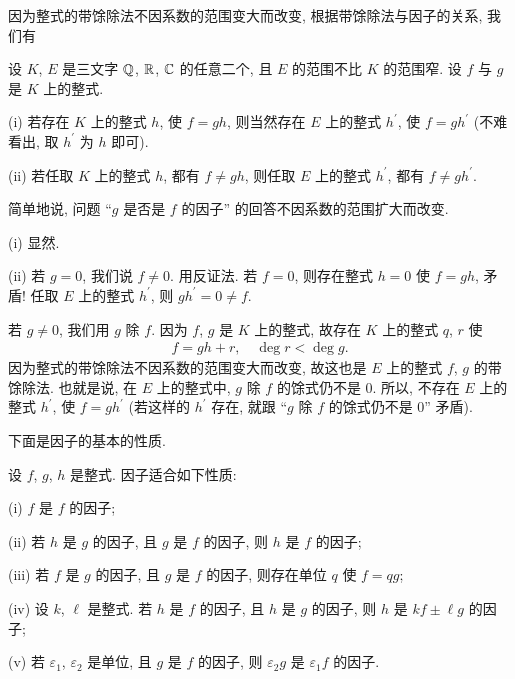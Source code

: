 因为整式的带馀除法不因系数的范围变大而改变, 根据带馀除法与因子的关系, 我们有
\begin{proposition}
    设 $K$, $E$ 是三文字 $\mathbb{Q}$, $\mathbb{R}$, $\mathbb{C}$ 的任意二个, 且 $E$ 的范围不比 $K$ 的范围窄. 设 $f$ 与 $g$ 是 $K$ 上的整式.

    (i) 若存在 $K$ 上的整式 $h$, 使 $f = gh$, 则当然存在 $E$ 上的整式 $h^{\prime}$, 使 $f = gh^{\prime}$ (不难看出, 取 $h^{\prime}$ 为 $h$ 即可).

    (ii) 若任取 $K$ 上的整式 $h$, 都有 $f \neq gh$, 则任取 $E$ 上的整式 $h^{\prime}$, 都有 $f \neq gh^{\prime}$.

    简单地说, 问题 ``$g$ 是否是 $f$ 的因子'' 的回答不因系数的范围扩大而改变.
\end{proposition}

\begin{pf}
    (i) 显然.

    (ii) 若 $g = 0$, 我们说 $f \neq 0$. 用反证法. 若 $f = 0$, 则存在整式 $h = 0$ 使 $f = gh$, 矛盾! 任取 $E$ 上的整式 $h^{\prime}$, 则 $gh^{\prime} = 0 \neq f$.

    若 $g \neq 0$, 我们用 $g$ 除 $f$. 因为 $f$, $g$ 是 $K$ 上的整式, 故存在 $K$ 上的整式 $q$, $r$ 使
    \begin{align*}
        f = gh + r, \quad \deg r < \deg g.
    \end{align*}
    因为整式的带馀除法不因系数的范围变大而改变, 故这也是 $E$ 上的整式 $f$, $g$ 的带馀除法. 也就是说, 在 $E$ 上的整式中, $g$ 除 $f$ 的馀式仍不是 $0$. 所以, 不存在 $E$ 上的整式 $h^{\prime}$, 使 $f = gh^{\prime}$ (若这样的 $h^{\prime}$ 存在, 就跟 ``$g$ 除 $f$ 的馀式仍不是 $0$'' 矛盾).
\end{pf}

下面是因子的基本的性质.

\begin{proposition}
    设 $f$, $g$, $h$ 是整式. 因子适合如下性质:

    (i) $f$ 是 $f$ 的因子;

    (ii) 若 $h$ 是 $g$ 的因子, 且 $g$ 是 $f$ 的因子, 则 $h$ 是 $f$ 的因子;

    (iii) 若 $f$ 是 $g$ 的因子, 且 $g$ 是 $f$ 的因子, 则存在单位 $q$ 使 $f = qg$;

    (iv) 设 $k$, $\ell$ 是整式. 若 $h$ 是 $f$ 的因子, 且 $h$ 是 $g$ 的因子, 则 $h$ 是 $kf \pm \ell g$ 的因子;

    (v) 若 $\varepsilon_1$, $\varepsilon_2$ 是单位, 且 $g$ 是 $f$ 的因子, 则 $\varepsilon_2 g$ 是 $\varepsilon_1 f$ 的因子.
\end{proposition}

